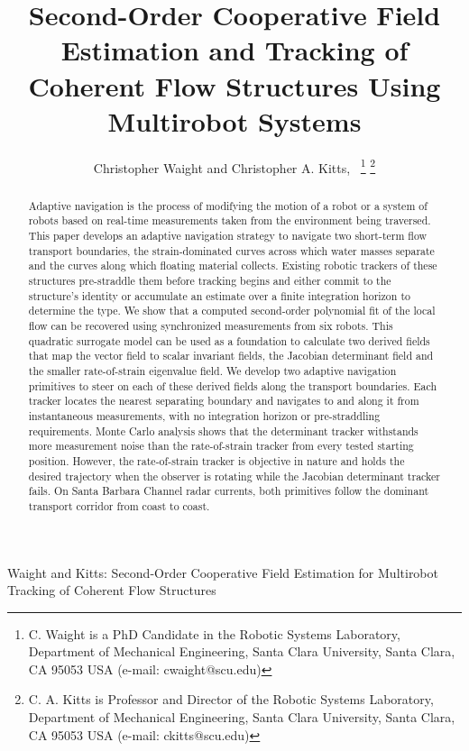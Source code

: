 \documentclass[lettersize,journal]{IEEEtran}
\begin{document}
\title{Second-Order Cooperative Field Estimation and Tracking of Coherent Flow Structures Using Multirobot Systems}

\author{Christopher Waight and Christopher A. Kitts,~
\thanks{C. Waight is a PhD Candidate in the Robotic Systems Laboratory, Department of Mechanical Engineering, Santa Clara University, Santa Clara, CA 95053 USA (e-mail: cwaight@scu.edu)}
\thanks{C. A. Kitts is Professor and Director of the Robotic Systems Laboratory, Department of Mechanical Engineering, Santa Clara University, Santa Clara, CA 95053 USA (e-mail: ckitts@scu.edu)}
}
%
{Waight and Kitts: Second-Order Cooperative Field Estimation for Multirobot Tracking of Coherent Flow Structures}

\maketitle

\begin{abstract}
Adaptive navigation is the process of modifying the motion of a robot or a system of robots based on 
real-time measurements taken from the environment being traversed. This paper 
develops an adaptive navigation strategy to navigate two short-term flow transport boundaries, the strain-dominated
curves across which water masses separate and the curves along which floating material collects.
Existing robotic trackers of these structures pre-straddle them before tracking begins and either commit to the structure's
identity or accumulate an estimate over a finite integration horizon to determine the type.
We show that a computed second-order polynomial fit of the local flow can be recovered using synchronized measurements from six robots.
This quadratic surrogate model can be used as a foundation to calculate two derived fields that map the vector field to scalar invariant fields, the Jacobian determinant field and the smaller rate-of-strain eigenvalue field.
We develop two adaptive navigation primitives to steer on each of these derived fields along the transport boundaries. Each tracker locates the nearest separating boundary
and navigates to and along it from instantaneous measurements, with no integration horizon or pre-straddling requirements.
Monte Carlo analysis shows that the determinant tracker withstands more measurement noise than the rate-of-strain tracker from every tested starting position.
However, the rate-of-strain tracker is objective in nature and holds the desired trajectory when the observer is rotating while the Jacobian determinant tracker fails.
On Santa Barbara Channel radar currents, both primitives follow the dominant transport corridor from coast to coast.

\end{abstract}
\end{document}
